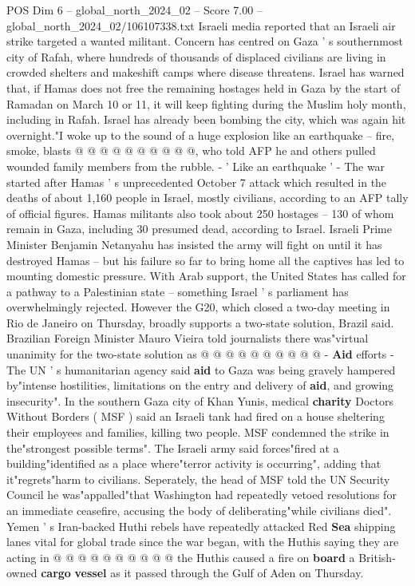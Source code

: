\begin{textsample}{POS Dim 6 – global\_north\_2024\_02 – Score 7.00 – global\_north\_2024\_02/106107338.txt}
Israeli media reported that an Israeli air strike targeted a wanted militant.
Concern has centred on Gaza ' s southernmost city of Rafah, where hundreds of thousands of displaced civilians are living in crowded shelters and makeshift camps where disease threatens.
Israel has warned that, if Hamas does not free the remaining hostages held in Gaza by the start of Ramadan on March 10 or 11, it will keep fighting during the Muslim holy month, including in Rafah.
Israel has already been bombing the city, which was again hit overnight."I woke up to the sound of a huge explosion like an earthquake -- fire, smoke, blasts @ @ @ @ @ @ @ @ @ @, who told AFP he and others pulled wounded family members from the rubble. - ' Like an earthquake ' - The war started after Hamas ' s unprecedented October 7 attack which resulted in the deaths of about 1,160 people in Israel, mostly civilians, according to an AFP tally of official figures.
Hamas militants also took about 250 hostages -- 130 of whom remain in Gaza, including 30 presumed dead, according to Israel.
Israeli Prime Minister Benjamin Netanyahu has insisted the army will fight on until it has destroyed Hamas -- but his failure so far to bring home all the captives has led to mounting domestic pressure.
With Arab support, the United States has called for a pathway to a Palestinian state -- something Israel ' s parliament has overwhelmingly rejected.
However the G20, which closed a two-day meeting in Rio de Janeiro on Thursday, broadly supports a two-state solution, Brazil said.
Brazilian Foreign Minister Mauro Vieira told journalists there was"virtual unanimity for the two-state solution as @ @ @ @ @ @ @ @ @ @ - \textbf{Aid} efforts - The UN ' s humanitarian agency said \textbf{aid} to Gaza was being gravely hampered by"intense hostilities, limitations on the entry and delivery of \textbf{aid}, and growing insecurity".
In the southern Gaza city of Khan Yunis, medical \textbf{charity} Doctors Without Borders ( MSF ) said an Israeli tank had fired on a house sheltering their employees and families, killing two people.
MSF condemned the strike in the"strongest possible terms".
The Israeli army said forces"fired at a building"identified as a place where"terror activity is occurring", adding that it"regrets"harm to civilians.
Seperately, the head of MSF told the UN Security Council he was"appalled"that Washington had repeatedly vetoed resolutions for an immediate ceasefire, accusing the body of deliberating"while civilians died".
Yemen ' s Iran-backed Huthi rebels have repeatedly attacked Red \textbf{Sea} shipping lanes vital for global trade since the war began, with the Huthis saying they are acting in @ @ @ @ @ @ @ @ @ @ the Huthis caused a fire on \textbf{board} a British-owned \textbf{cargo} \textbf{vessel} as it passed through the Gulf of Aden on Thursday.

\end{textsample}
